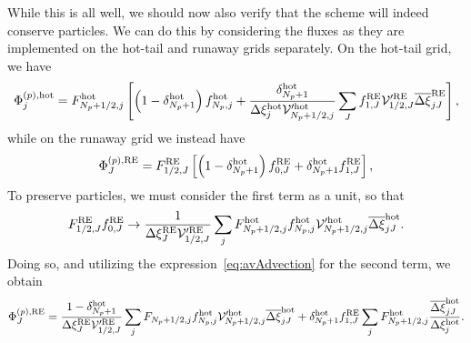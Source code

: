 \documentclass{notes}
\newcommand{\Vp}{\mathcal{V}'}
\begin{document}
    While this is all well, we should now also verify that the scheme will
    indeed conserve particles. We can do this by considering the fluxes as they
    are implemented on the hot-tail and runaway grids separately. On the
    hot-tail grid, we have
    \begin{equation}\label{eq:PhiPhot2}
        \Phi^{(p),{\rm hot}}_j = F^{\rm hot}_{N_p+1/2,j} \left[
            \left( 1-\delta^{\rm hot}_{N_p+1}\right)f^{\rm hot}_{N_p,j} +
            \frac{\delta^{\rm hot}_{N_p+1}}{\Delta\xi^{\rm hot}_j\Vp^{\rm hot}_{N_p+1/2,j}} \sum_J
                f_{1,J}^{\rm RE} \Vp^{\rm RE}_{1/2,J} \overline{\Delta\xi}_{jJ}^{\rm RE}
        \right],
    \end{equation}
    while on the runaway grid we instead have
    \begin{equation}\label{eq:PhiPRE}
        \begin{aligned}
            \Phi^{(p),{\rm RE}}_J &= F^{\rm RE}_{1/2,J} \left[
                \left( 1-\delta^{\rm hot}_{N_p+1} \right)f^{\rm RE}_{0,J} +
                \delta^{\rm hot}_{N_p+1} f^{\rm RE}_{1,J}
            \right],\\
        \end{aligned}
    \end{equation}
    To preserve particles, we must consider the first term as a unit, so that
    \begin{equation}
        F_{1/2,J}^{\rm RE} f_{0,J}^{\rm RE} \to
        \frac{1}{\Delta\xi^{\rm RE}_J\Vp^{\rm RE}_{1/2,J}} \sum_j
            F_{N_p+1/2,j}^{\rm hot}f_{N_p,j}^{\rm hot}
            \Vp^{\rm hot}_{N_p+1/2,j} \overline{\Delta\xi}_{jJ}^{\rm hot}.
    \end{equation}
    Doing so, and utilizing the expression~\eqref{eq:avAdvection} for the second
    term, we obtain
    \begin{equation}
        \Phi^{(p),{\rm RE}}_J =
            \frac{1-\delta^{\rm hot}_{N_p+1}}{\Delta\xi^{\rm RE}_J\Vp^{\rm RE}_{1/2,J}} \sum_j
                F_{N_p+1/2,j}f_{N_p,j}^{\rm hot}
                \Vp^{\rm hot}_{N_p+1/2,j} \overline{\Delta\xi}_{jJ}^{\rm hot} +
            \delta^{\rm hot}_{N_p+1} f^{\rm RE}_{1,J}
            \sum_j F^{\rm hot}_{N_p+1/2,j}
            \frac{\overline{\Delta\xi}^{\rm hot}_{jJ}}{\Delta\xi_j^{\rm hot}}.
    \end{equation}
\end{document}
